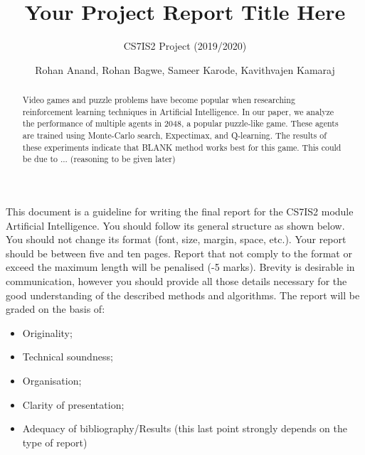 \documentclass{svproc}
\begin{document}
\mainmatter
\title{Your Project Report Title Here
}
\subtitle{CS7IS2 Project (2019/2020)}
\author{Rohan Anand, Rohan Bagwe, Sameer Karode, Kavithvajen Kamaraj}


\maketitle              %

\begin{abstract}
Video games and puzzle problems have become popular when researching reinforcement learning techniques in Artificial Intelligence. In our paper, we analyze the performance of multiple agents in 2048, a popular puzzle-like game. These agents are trained using Monte-Carlo search, Expectimax, and Q-learning. The results of these experiments indicate that BLANK method works best for this game. This could be due to ... (reasoning to be given later)
\end{abstract}
%

This document is a guideline for writing the final report for the CS7IS2 module Artificial Intelligence. You should follow its general structure as shown below.
You should not change its format (font, size, margin, space, etc.). 
Your report should be between five and ten pages. Report that not comply to the format or exceed the maximum length will be penalised (-5 marks).
Brevity is desirable in communication, however you should provide all those details necessary for the good understanding of the described methods and algorithms. 
The report will be graded on the basis of:
\begin{itemize}
\item Originality;
\item Technical soundness;
\item Organisation;
\item Clarity of presentation;
\item Adequacy of bibliography/Results (this last point strongly depends on the type of report)
\end{itemize}
\end{document}
